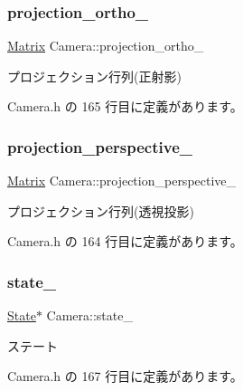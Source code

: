 \subsubsection{\texorpdfstring{projection\+\_\+ortho\+\_\+}{projection\_ortho\_}}
{\footnotesize\ttfamily \mbox{\hyperlink{class_matrix}{Matrix}} Camera\+::projection\+\_\+ortho\+\_\+\hspace{0.3cm}{\ttfamily [private]}}



プロジェクション行列(正射影) 



 Camera.\+h の 165 行目に定義があります。

\mbox{\label{class_camera_ac7f9d66ae42e2aa9db2eb3da07eb0a24}} 
\subsubsection{\texorpdfstring{projection\+\_\+perspective\+\_\+}{projection\_perspective\_}}
{\footnotesize\ttfamily \mbox{\hyperlink{class_matrix}{Matrix}} Camera\+::projection\+\_\+perspective\+\_\+\hspace{0.3cm}{\ttfamily [private]}}



プロジェクション行列(透視投影) 



 Camera.\+h の 164 行目に定義があります。

\mbox{\label{class_camera_ab2f0ce08b9fee8a4481b323f2856b245}} 
\subsubsection{\texorpdfstring{state\+\_\+}{state\_}}
{\footnotesize\ttfamily \mbox{\hyperlink{class_camera_1_1_state}{State}}$\ast$ Camera\+::state\+\_\+\hspace{0.3cm}{\ttfamily [private]}}



ステート 



 Camera.\+h の 167 行目に定義があります。

